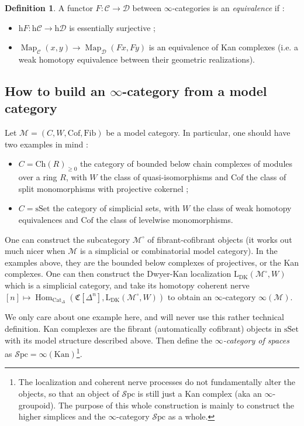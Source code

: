 \documentclass[11pt]{article}
\theoremstyle{definition}
\newtheorem{definition}[theorem]{Definition}
\newcommand{\C}{\mathcal{C}}
\newcommand{\Cat}{\mathrm{Cat}}
\newcommand{\Cof}{\mathrm{Cof}}
\newcommand{\D}{\mathcal{D}}
\newcommand{\Fib}{\mathrm{Fib}}
\newcommand{\h}{\mathrm{h}}
\newcommand{\Hom}{\operatorname{Hom}}
\newcommand{\Kan}{\mathrm{Kan}}
\newcommand{\M}{\mathscr{M}}
\newcommand{\Map}{\operatorname{Map}}
\newcommand{\Spc}{\mathcal{S}\mathrm{pc}}
\newcommand{\sSet}{\mathrm{sSet}}
\begin{document}
\begin{definition}
    A functor $F : \C \to \D$ between $\infty$-categories is an \emph{equivalence} if :
    \begin{itemize}
        \item $\h F : \h\C \to \h\D$ is essentially surjective ;
        \item $\Map_{\C}(x, y) \to \Map_{\D}(Fx, Fy)$ is an equivalence of Kan complexes (i.e. a weak homotopy equivalence between their geometric realizations).
    \end{itemize}
\end{definition}

\subsection{How to build an $\infty$-category from a model category}

Let $\M = (C, W, \Cof, \Fib)$ be a model category.
In particular, one should have two examples in mind :
\begin{itemize}
    \item $C = \mathrm{Ch}(R)_{\geqslant 0}$ the category of bounded below chain complexes of modules over a ring $R$, with $W$ the class of quasi-isomorphisms and $\Cof$ the class of split monomorphisms with projective cokernel ;
    \item $C = \sSet$ the category of simplicial sets, with $W$ the class of weak homotopy equivalences and $\Cof$ the class of levelwise monomorphisms.
\end{itemize}

One can construct the subcategory $\M^{\circ}$ of fibrant-cofibrant objects (it works out much nicer when $\M$ is a simplicial or combinatorial model category).
In the examples above, they are the bounded below complexes of projectives, or the Kan complexes.
One can then construct the Dwyer-Kan localization $\mathrm{L}_{\mathrm{DK}}(\M^{\circ}, W)$ which is a simplicial category, and take its homotopy coherent nerve $[n] \mapsto \Hom_{\Cat_{\Delta}}(\mathfrak{C}[\Delta^n], \mathrm{L}_{\mathrm{DK}}(\M^{\circ}, W))$ to obtain an $\infty$-category $\infty(\M)$.

We only care about one example here, and will never use this rather technical definition.
Kan complexes are the fibrant (automatically cofibrant) objects in $\sSet$ with its model structure described above.
Then define the \emph{$\infty$-category of spaces} as $\Spc = \infty(\Kan)$\footnote{The localization and coherent nerve processes do not fundamentally alter the objects, so that an object of $\Spc$ is still just a Kan complex (aka an $\infty$-groupoid).
The purpose of this whole construction is mainly to construct the higher simplices and the $\infty$-category $\Spc$ as a whole.}.
\end{document}
